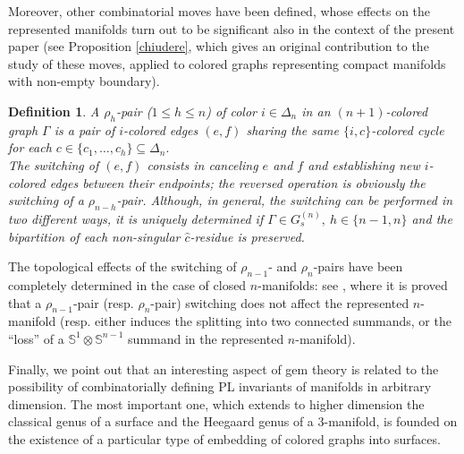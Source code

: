 \documentclass[12pt,a4paper]{article}
\newtheorem{definition}{Definition}
\newcommand{\G}{\Gamma}
\begin{document}
Moreover, other combinatorial moves have been defined, whose effects on the represented manifolds turn out to be significant also in the context of the present paper (see Proposition \ref{chiudere}, which gives an original contribution to the study of these moves, applied to colored graphs representing compact manifolds with non-empty boundary). 

\begin{definition}\label{rho-pair} {\em A $\rho_h${\it -pair} ($1\leq h\leq n$) of color $i\in\Delta_n$ in an $(n+1)$-colored graph $\Gamma$ is a pair of $i$-colored edges $(e,f)$ sharing the  same $\{i,c\}$-colored cycle for each $c\in\{c_1,\ldots,c_h\}\subseteq\Delta_n.$ 
\\
The {\it switching} of $(e,f)$ consists in canceling $e$ and $f$ and establishing new $i$-colored edges between their endpoints; the reversed operation is obviously the switching of a $\rho_{n-h}$-pair.  
Although, in general, the switching can 
be performed in two different ways, it is uniquely determined if $\G \in G^{(n)}_s,\ h\in \{n-1, n\}$ and the bipartition of each non-singular $\hat c$-residue is preserved.  }
\end{definition} 

The topological effects of the switching of $\rho_{n-1}$- and $\rho_n$-pairs have been completely determined in the case of closed $n$-manifolds: see \cite{Bandieri-Gagliardi}, where it is proved that a $\rho_{n-1}$-pair (resp. $\rho_n$-pair) switching does not affect the represented $n$-manifold  (resp. either induces the splitting into two connected summands, or the ``loss'' of a $\mathbb S^{1} \otimes \mathbb S^{n-1}$  summand in the represented $n$-manifold). 

\bigskip 

Finally, we point out that an interesting aspect of gem theory is related to the possibility of combinatorially defining PL invariants of manifolds in arbitrary dimension.  The most important one, which extends to higher dimension the classical genus of a surface and the Heegaard genus of a $3$-manifold, is founded on the existence of a particular type of embedding of colored graphs into surfaces. 
\end{document}
